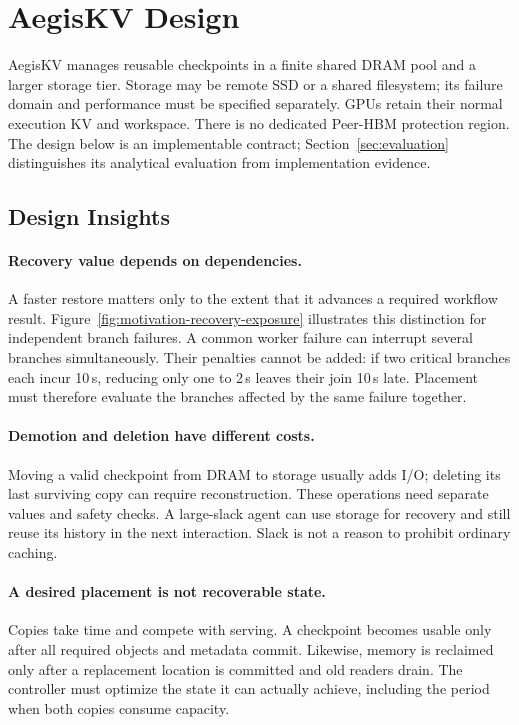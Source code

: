 \section{AegisKV Design}
\label{sec:design}

AegisKV manages reusable checkpoints in a finite shared DRAM pool and a
larger storage tier. Storage may be remote SSD or a shared filesystem;
its failure domain and performance must be specified separately. GPUs
retain their normal execution KV and workspace. There is no dedicated
Peer-HBM protection region. The design below is an implementable contract;
Section~\ref{sec:evaluation} distinguishes its analytical evaluation from
implementation evidence.

\subsection{Design Insights}
\label{sec:design-insights}

\paragraph{Recovery value depends on dependencies.}
A faster restore matters only to the extent that it advances a required
workflow result. Figure~\ref{fig:motivation-recovery-exposure} illustrates
this distinction for independent branch failures. A common worker failure
can interrupt several branches simultaneously. Their penalties cannot be
added: if two critical branches each incur 10\,s, reducing only one to
2\,s leaves their join 10\,s late. Placement must therefore evaluate the
branches affected by the same failure together.

\paragraph{Demotion and deletion have different costs.}
Moving a valid checkpoint from DRAM to storage usually adds I/O; deleting
its last surviving copy can require reconstruction. These operations
need separate values and safety checks. A large-slack agent can use
storage for recovery and still reuse its history in the next interaction.
Slack is not a reason to prohibit ordinary caching.

\paragraph{A desired placement is not recoverable state.}
Copies take time and compete with serving. A checkpoint becomes usable
only after all required objects and metadata commit. Likewise, memory is
reclaimed only after a replacement location is committed and old readers
drain. The controller must optimize the state it can actually achieve,
including the period when both copies consume capacity.

